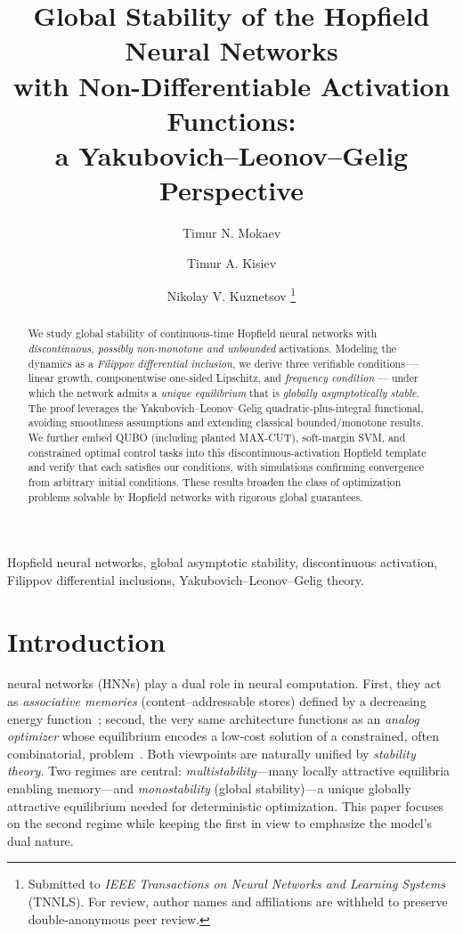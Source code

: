 \documentclass[journal]{IEEEtran}
\title{Global Stability of the Hopfield Neural Networks\\ with Non-Differentiable Activation Functions:\\
            a Yakubovich--Leonov--Gelig Perspective}
\author{Timur N. Mokaev \and Timur A. Kisiev \and Nikolay V. Kuznetsov
      \thanks{Submitted to \emph{IEEE Transactions on Neural Networks and Learning Systems} (TNNLS). 
            For review, author names and affiliations are withheld to preserve double-anonymous peer review.}
}
\theoremstyle{myplain}
\begin{document}
\maketitle

\begin{abstract}
We study global stability of continuous-time Hopfield neural networks with 
\emph{discontinuous, possibly non-monotone and unbounded} activations. 
Modeling the dynamics as a \emph{Filippov differential inclusion}, 
we derive three verifiable conditions --- linear growth, componentwise one-sided Lipschitz, 
and \emph{frequency condition} --- under which the network admits a \emph{unique equilibrium} 
that is \emph{globally asymptotically stable}. 
The proof leverages the Yakubovich--Leonov--Gelig quadratic-plus-integral functional, 
avoiding smoothness assumptions and extending classical bounded/monotone results. 
We further embed QUBO (including planted MAX-CUT), soft-margin SVM, and constrained optimal control tasks 
into this discontinuous-activation Hopfield template and verify that each satisfies our conditions, with simulations confirming convergence from arbitrary initial conditions. 
These results broaden the class of optimization problems solvable by Hopfield networks with rigorous global guarantees.
\end{abstract}

\begin{IEEEkeywords}
Hopfield neural networks, 
global asymptotic stability, 
discontinuous activation, 
Filippov differential inclusions, 
Yakubovich--Leonov--Gelig theory.
\end{IEEEkeywords}


\section{Introduction}\label{sec:intro}
 neural networks (HNNs) play a dual role in neural computation.
First, they act as \emph{associative memories} (content--addressable stores) defined by a
decreasing energy function~\cite{hopfield1982}; second, the very same architecture functions as an
\emph{analog optimizer} whose equilibrium encodes a low-cost solution of a constrained,
often combinatorial, problem~\cite{hopfieldTank1985}.
Both viewpoints are naturally unified by \emph{stability theory}.
Two regimes are central: \emph{multistability}---many locally attractive equilibria enabling memory---and
\emph{monostability} (global stability)---a unique globally attractive equilibrium needed for deterministic optimization.
This paper focuses on the second regime while keeping the first in view to emphasize the model's dual nature.
\end{document}
